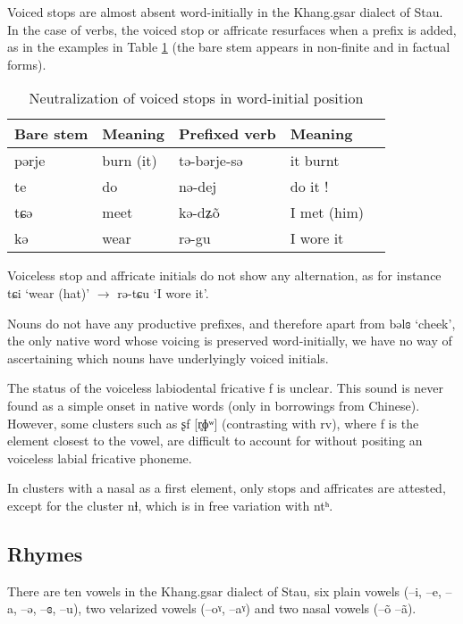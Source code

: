 \documentclass[oneside,a4paper,11pt]{article}
\newcommand{\ipa}[1]{{\phon #1}} %
\begin{document}
Voiced stops are almost absent word-initially in the Khang.gsar dialect of Stau. In the case of verbs, the voiced stop or affricate resurfaces when a prefix is added, as in the examples in Table \ref{tab:voiced} (the bare stem appears in non-finite and in factual forms).

 \begin{table}[H]
 \caption{Neutralization of voiced stops in word-initial position} \label{tab:voiced} \centering 
\begin{tabular}{lllll}
\toprule
Bare stem & Meaning & Prefixed verb & Meaning \\
\midrule
\ipa{pərje} & burn (it) &\ipa{tə-bərje-sə} & it burnt \\
\ipa{te} & do &\ipa{nə-dej} & do it !\\
\ipa{tɕə} & meet &\ipa{kə-dʑõ} & I met (him)\\
\ipa{kə} &wear &\ipa{rə-gu} & I wore it \\
\bottomrule
\end{tabular}
\end{table}
Voiceless stop and affricate initials do not show any alternation, as for instance \ipa{tɕi} `wear (hat)' $\rightarrow$ \ipa{rə-tɕu} `I wore it'.

Nouns do not have any productive prefixes, and therefore apart from \ipa{bəlɞ} `cheek', the only native word whose voicing is preserved word-initially, we have no way of ascertaining which nouns have underlyingly voiced initials.

 
The status of the voiceless labiodental fricative \ipa{f} is unclear. This sound is never found as a simple onset in native words (only in borrowings from Chinese). However, some clusters such as  \ipa{ʂf} [\ipa{r̥ɸʷ}] (contrasting with \ipa{rv}), where \ipa{f} is the element closest to the vowel, are difficult to account for without positing an voiceless labial fricative phoneme.
 
 In clusters with a nasal as a first element, only stops and affricates are attested, except for the cluster \ipa{nɬ}, which is in free variation with \ipa{ntʰ}.
 
  \subsection{Rhymes}
 
There are ten vowels in the Khang.gsar dialect of Stau, six plain vowels (--\ipa{i}, --\ipa{e}, --\ipa{a}, --\ipa{ə}, --\ipa{ɞ},  --\ipa{u}), two velarized vowels (--\ipa{oˠ}, --\ipa{aˠ}) and two nasal vowels (--\ipa{õ}   --\ipa{ã}).
\end{document}
